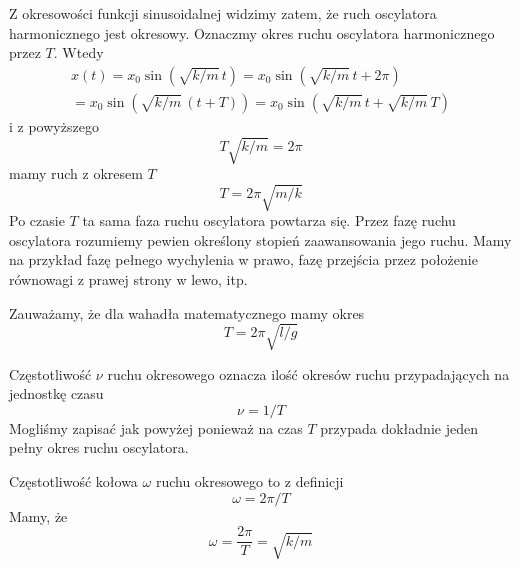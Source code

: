 \documentclass[12pt,a4paper,pl,fleqn]{article}
\begin{document}




Z okresowości funkcji sinusoidalnej widzimy zatem, że ruch oscylatora harmonicznego jest okresowy.
Oznaczmy okres ruchu oscylatora harmonicznego przez $T$\@. Wtedy
\begin{eqnarray}
    x(t) = x_{0} \sin(\sqrt{k/m} \, t)
    = x_{0} \sin(\sqrt{k/m} \, t + 2\pi)  \\
    = x_{0} \sin(\sqrt{k/m} \, ( t + T ))
    = x_{0} \sin(\sqrt{k/m} \, t + \sqrt{k/m} \, T)  \nonumber
\end{eqnarray}
i z powyższego
\begin{equation}
    T \sqrt{k/m} = 2 \pi
\end{equation}
mamy ruch z okresem $T$
\begin{equation}
    T  = 2 \pi \sqrt{m/k}
\end{equation}
Po czasie $T$ ta sama faza ruchu oscylatora powtarza się. Przez fazę ruchu oscylatora
rozumiemy pewien określony stopień zaawansowania jego ruchu. Mamy na przykład fazę pełnego wychylenia w prawo,
 fazę przejścia przez położenie równowagi z prawej strony w lewo, itp.

Zauważamy, że dla wahadła matematycznego mamy okres
\begin{equation}
    T  = 2 \pi \sqrt{l/g}
\end{equation}

Częstotliwość $\nu$ ruchu okresowego oznacza ilość okresów ruchu przypadających na jednostkę czasu
\begin{equation}
\label{eq:frequency}
    \nu = 1/T
\end{equation}
Mogliśmy zapisać jak powyżej ponieważ na czas $T$ przypada dokładnie jeden pełny okres ruchu oscylatora.

Częstotliwość kołowa $\omega$ ruchu okresowego to z definicji
\begin{equation}
\label{eq:circular_frequency}
    \omega = 2 \pi/T
\end{equation}
Mamy, że
\begin{equation}
\label{eq:circular_frequency_explained}
     \omega = \frac{2\pi}{T} = \sqrt{k/m}
\end{equation}
\end{document}

